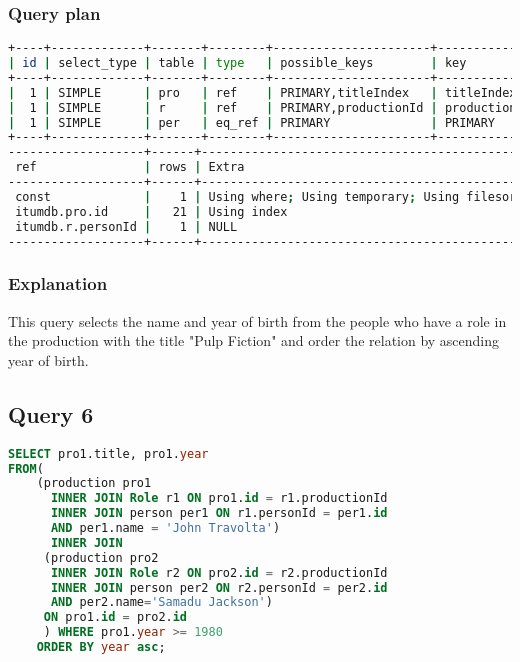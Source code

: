 \subsubsection{Query plan}
\begin{lstlisting}[language=bash]
+----+-------------+-------+--------+----------------------+--------------+---------+
| id | select_type | table | type   | possible_keys        | key          | key_len |
+----+-------------+-------+--------+----------------------+--------------+---------+
|  1 | SIMPLE      | pro   | ref    | PRIMARY,titleIndex   | titleIndex   | 32      |
|  1 | SIMPLE      | r     | ref    | PRIMARY,productionId | productionId | 4       |
|  1 | SIMPLE      | per   | eq_ref | PRIMARY              | PRIMARY      | 4       |
+----+-------------+-------+--------+----------------------+--------------+---------+
-------------------+------+----------------------------------------------+
 ref               | rows | Extra                                        |
-------------------+------+----------------------------------------------+
 const             |    1 | Using where; Using temporary; Using filesort |
 itumdb.pro.id     |   21 | Using index                                  |
 itumdb.r.personId |    1 | NULL                                         |
-------------------+------+----------------------------------------------+
\end{lstlisting}

\subsubsection{Explanation}
This query selects the name and year of birth from the people who have a role in the production with the title "Pulp Fiction" and order the relation by ascending year of birth.


\subsection{Query 6}
\begin{lstlisting}[language=sql]
SELECT pro1.title, pro1.year
FROM(
	(production pro1
	  INNER JOIN Role r1 ON pro1.id = r1.productionId
	  INNER JOIN person per1 ON r1.personId = per1.id
	  AND per1.name = 'John Travolta')
	  INNER JOIN
	 (production pro2
	  INNER JOIN Role r2 ON pro2.id = r2.productionId
	  INNER JOIN person per2 ON r2.personId = per2.id
	  AND per2.name='Samadu Jackson') 
	 ON pro1.id = pro2.id
	 ) WHERE pro1.year >= 1980
	ORDER BY year asc;
\end{lstlisting}

